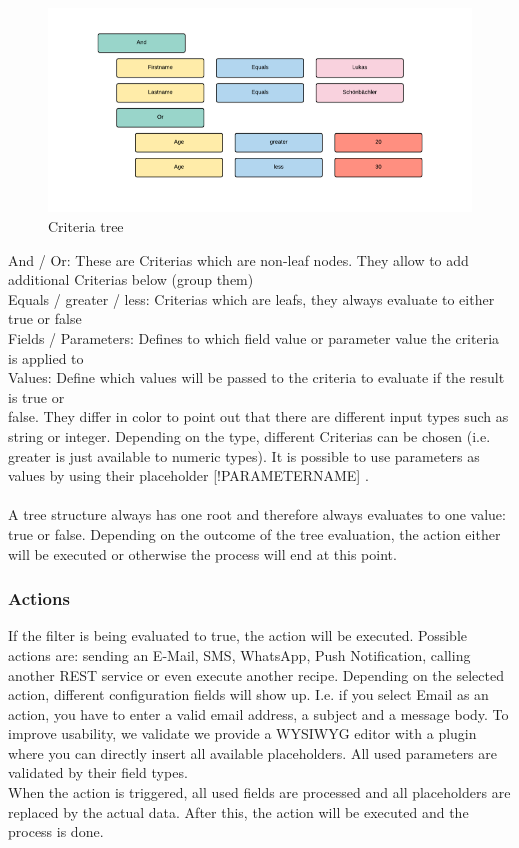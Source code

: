 \documentclass[11pt]{article} %
\begin{document}
\begin{figure}[H]
\begin{center}
\includegraphics[width=1.0\textwidth]{criteria}
\end{center}
\caption{Criteria tree}
\label{fig:criteria}
\end{figure}

\colorbox{green!30}{   } And / Or: These are Criterias which are non-leaf nodes. They allow to add additional Criterias below (group them)\\
\colorbox{blue!30}{   } Equals / greater / less: Criterias which are leafs, they always evaluate to either true or false\\
\colorbox{yellow!30}{   } Fields / Parameters: Defines to which field value or parameter value the criteria is applied to\\
\colorbox{pink!30}{   } Values: Define which values will be passed to the criteria to evaluate if the result is true or \\
\colorbox{red!30}{   } false. They differ in color to point out that there are different input types such as string or integer. Depending on the type, different Criterias can be chosen (i.e. greater is just available to numeric types). It is possible to use parameters as values by using their placeholder [!PARAMETERNAME] .\\
\\
A tree structure always has one root and therefore always evaluates to one value: true or false. Depending on the outcome of the tree evaluation, the action either will be executed or otherwise the process will end at this point.

\subsubsection{Actions}
If the filter is being evaluated to true, the action will be executed. Possible actions are: sending an E-Mail, SMS, WhatsApp, Push Notification, calling another REST service or even execute another recipe. Depending on the selected action, different configuration fields will show up. I.e. if you select Email as an action, you have to enter a valid email address, a subject and a message body. To improve usability, we validate we provide a WYSIWYG\cite{tinymce} editor with a plugin where you can directly insert all available placeholders. All used parameters are validated by their field types.\\
When the action is triggered, all used fields are processed and all placeholders are replaced by the actual data. After this, the action will be executed and the process is done.
\end{document}
